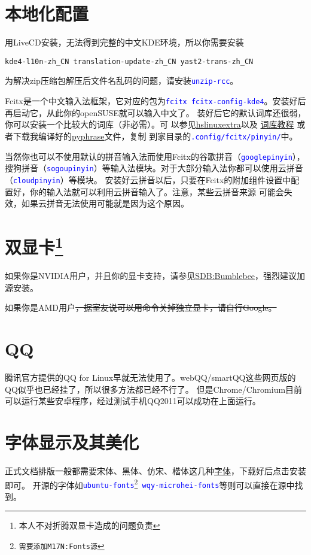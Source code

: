 \documentclass[11pt]{article}
\newcommand{\command}[1]{\texttt{\textcolor{blue}{#1}}}
\newcommand{\soft}[1]{\texttt{\textcolor{blue}{#1}}}
\begin{document}
\section{本地化配置}
用LiveCD安装，无法得到完整的中文KDE环境，所以你需要安装
\begin{Verbatim}[formatcom=\color{codecolor}]
    kde4-l10n-zh_CN translation-update-zh_CN yast2-trans-zh_CN
\end{Verbatim}

为解决zip压缩包解压后文件名乱码的问题，请安装\soft{unzip-rcc}。

Fcitx是一个中文输入法框架，它对应的包为\soft{fcitx fcitx-config-kde4}。安装好后再启动它，从此你的openSUSE就可以输入中文了。
装好后它的默认词库还很弱，你可以安装一个比较大的词库（非必需）。可%
以参见\href{https://code.google.com/p/hslinuxextra/}{hs\-linux\-extra}以及%
\href{https://www.librehat.com/fcitx-sogou-pinyin-cell-database-convert-import-guide/}{词库教程}%
或者下载我编译好的\href{http://pan.baidu.com/s/1i3HtJ4T}{pyphrase}文件，复制
到家目录的\command{.config/fcitx/pinyin/}中。

当然你也可以不使用默认的拼音输入法而使用Fcitx的谷歌拼音（\soft{goo\-gle\-pin\-yin}），
搜狗拼音（\soft{so\-gou\-pin\-yin}）等输入法模块。对于大部分输入法你都可以使用云拼音（\soft{cloud\-pin\-yin}）等模块。
安装好云拼音以后，只要在Fcitx的附加组件设置中配置好，你的输入法就可以利用云拼音输入了。注意，某些云拼音来源
可能会失效，如果云拼音无法使用可能就是因为这个原因。
\section[双显卡]{双显卡\protect\footnote{本人不对折腾双显卡造成的问题负责}}
如果你是NVIDIA用户，并且你的显卡支持，请参见\href{https://zh.opensuse.org/SDB:Bumblebee}{SDB:Bumblebee}，强烈建议加源安装。

如果你是AMD用户\sout{，据室友说可以用命令关掉独立显卡，请自行Google。}
\section{QQ}
腾讯官方提供的QQ for Linux早就无法使用了。webQQ/smartQQ这些网页版的QQ似乎也已经挂了，所以很多方法都已经不行了。
但是Chrome/Chromium目前可以运行某些安卓程序，经过测试手机QQ2011可以成功在上面运行。
\section{字体显示及其美化}
正式文档排版一般都需要宋体、黑体、仿宋、楷体这几种\href{http://pan.baidu.com/s/1mgiHWmO}{字体}，下载好后点击安装即可。
开源的字体如\soft{ubuntu-fonts\footnote{需要添加M17N:Fonts源} wqy-microhei-fonts}等则可以直接在源中找到。
\end{document}
